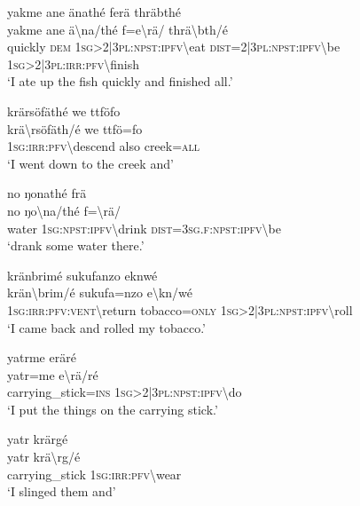 \ea\label{ex:13:a1400}
yakme ane änathé ferä thräbthé\\
\gll yakme	ane	ä{\textbackslash}na/thé	f=e{\textbackslash}rä/	thrä{\textbackslash}bth/é\\
     quickly	\textsc{dem}	1\textsc{sg}>2|3\textsc{pl}:\textsc{npst}:\textsc{ipfv}{\textbackslash}eat	\textsc{dist}=2|3\textsc{pl}:\textsc{npst}:\textsc{ipfv}{\textbackslash}be	1\textsc{sg}>2|3\textsc{pl}:\textsc{irr}:\textsc{pfv}{\textbackslash}finish\\
\glt `I ate up the fish quickly and finished all.'
\z

\ea\label{ex:13:a1401}
krärsöfäthé we ttföfo\\
\gll krä{\textbackslash}rsöfäth/é	we	ttfö=fo\\
     1\textsc{sg}:\textsc{irr}:\textsc{pfv}{\textbackslash}descend	also	creek=\textsc{all}\\
\glt `I went down to the creek and'
\z

\ea\label{ex:13:a1402}
no ŋonathé frä\\
\gll no	ŋo{\textbackslash}na/thé	f={\textbackslash}rä/\\
     water	1\textsc{sg}:\textsc{npst}:\textsc{ipfv}{\textbackslash}drink	\textsc{dist}=3\textsc{sg}.\textsc{f}:\textsc{npst}:\textsc{ipfv}{\textbackslash}be\\
\glt `drank some water there.'
\z

\ea\label{ex:13:a1403}
kränbrimé sukufanzo eknwé\\
\gll krän{\textbackslash}brim/é	sukufa=nzo	e{\textbackslash}kn/wé\\
     1\textsc{sg}:\textsc{irr}:\textsc{pfv}:\textsc{vent}{\textbackslash}return	tobacco=\textsc{only}	1\textsc{sg}>2|3\textsc{pl}:\textsc{npst}:\textsc{ipfv}{\textbackslash}roll\\
\glt `I came back and rolled my tobacco.'
\z

\ea\label{ex:13:a1404}
yatrme eräré\\
\gll yatr=me	e{\textbackslash}rä/ré\\
     carrying\_stick=\textsc{ins}	1\textsc{sg}>2|3\textsc{pl}:\textsc{npst}:\textsc{ipfv}{\textbackslash}do\\
\glt `I put the things on the carrying stick.'
\z

\ea\label{ex:13:a1405}
yatr krärgé\\
\gll yatr	krä{\textbackslash}rg/é\\
     carrying\_stick	1\textsc{sg}:\textsc{irr}:\textsc{pfv}{\textbackslash}wear\\
\glt `I slinged them and'
\z

